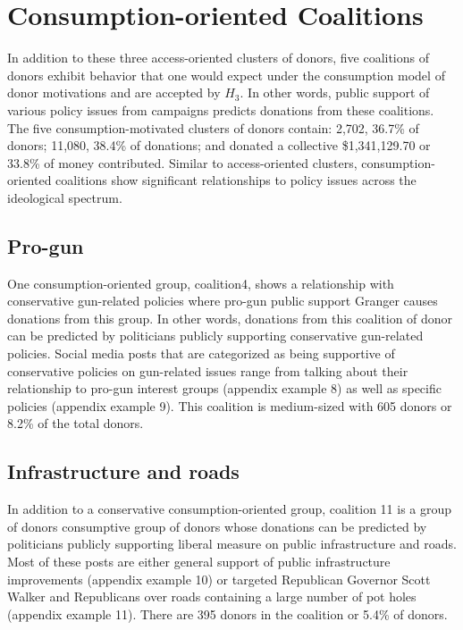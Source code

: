 \documentclass[12pt,]{article}
\begin{document}
\hypertarget{consumption-oriented-coalitions}{%
\section{Consumption-oriented
Coalitions}\label{consumption-oriented-coalitions}}

In addition to these three access-oriented clusters of donors, five
coalitions of donors exhibit behavior that one would expect under the
consumption model of donor motivations and are accepted by \(H_{3}\). In
other words, public support of various policy issues from campaigns
predicts donations from these coalitions. The five consumption-motivated
clusters of donors contain: 2,702, 36.7\% of donors; 11,080, 38.4\% of
donations; and donated a collective \$1,341,129.70 or 33.8\% of money
contributed. Similar to access-oriented clusters, consumption-oriented
coalitions show significant relationships to policy issues across the
ideological spectrum.

\hypertarget{pro-gun}{%
\subsection{Pro-gun}\label{pro-gun}}

One consumption-oriented group, coalition4, shows a relationship with
conservative gun-related policies where pro-gun public support Granger
causes donations from this group. In other words, donations from this
coalition of donor can be predicted by politicians publicly supporting
conservative gun-related policies. Social media posts that are
categorized as being supportive of conservative policies on gun-related
issues range from talking about their relationship to pro-gun interest
groups (appendix example 8) as well as specific policies (appendix
example 9). This coalition is medium-sized with 605 donors or 8.2\% of
the total donors.

\hypertarget{infrastructure-and-roads}{%
\subsection{Infrastructure and roads}\label{infrastructure-and-roads}}

In addition to a conservative consumption-oriented group, coalition 11
is a group of donors consumptive group of donors whose donations can be
predicted by politicians publicly supporting liberal measure on public
infrastructure and roads. Most of these posts are either general support
of public infrastructure improvements (appendix example 10) or targeted
Republican Governor Scott Walker and Republicans over roads containing a
large number of pot holes (appendix example 11). There are 395 donors in
the coalition or 5.4\% of donors.
\end{document}
